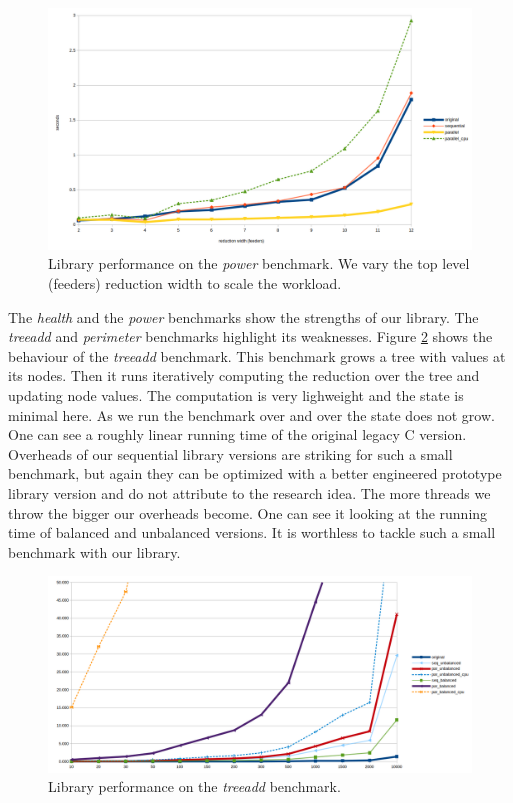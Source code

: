 \begin{figure}[!htb]
\includegraphics[width=1.0\textwidth]{images/power_reduction_width.png}
\caption{Library performance on the \textit{power} benchmark. We vary the top level (feeders) reduction width to scale the workload.}
\label{fig:performance_power_reduction_width}
\end{figure}\newline\null
\quad The \textit{health} and the \textit{power} benchmarks show the strengths of our library. The \textit{treeadd} and \textit{perimeter} benchmarks highlight its weaknesses. Figure \ref{fig:performance_treeadd} shows the behaviour of the \textit{treeadd} benchmark. This benchmark grows a tree with values at its nodes. Then it runs iteratively computing the reduction over the tree and updating node values. The computation is very lighweight and the state is minimal here. As we run the benchmark over and over the state does not grow. One can see a roughly linear running time of the original legacy C version. Overheads of our sequential library versions are striking for such a small benchmark, but again they can be optimized with a better engineered prototype library version and do not attribute to the research idea. The more threads we throw the bigger our overheads become. One can see it looking at the running time of balanced and unbalanced versions. It is worthless to tackle such a small benchmark with our library.      
\begin{figure}[!htb]
\includegraphics[width=1.0\textwidth]{images/treeadd_depth_16.png}
\caption{Library performance on the \textit{treeadd} benchmark.}
\label{fig:performance_treeadd}
\end{figure}\newline\null
